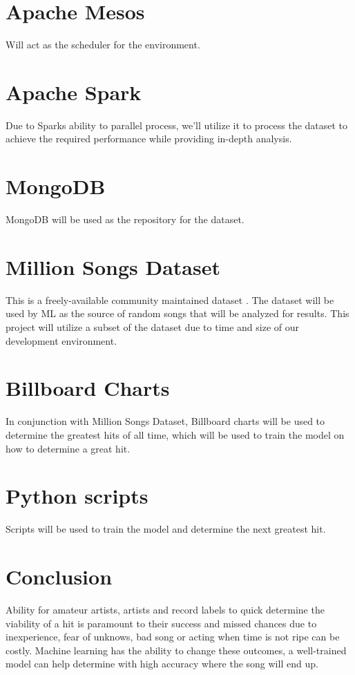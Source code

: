 \documentclass[9pt,twocolumn,twoside]{styles/osajnl}
\begin{document}
\section*{Apache Mesos}
Will act as the scheduler for the environment.

\section*{Apache Spark}
Due to Sparks ability to parallel process, we’ll utilize it to process
the dataset to achieve the required performance while providing
in-depth analysis.

\section*{MongoDB}
MongoDB will be used as the repository for the dataset.

\section{Million Songs Dataset}
This is a freely-available community maintained dataset  \cite{www-millionsong}. The dataset
will be used by ML as the source of random songs that will be analyzed
for results. This project will utilize a subset of the dataset due to
time and size of our development environment. 

\section*{Billboard Charts}
In conjunction with Million Songs Dataset, Billboard charts  \cite{www-billboard} will be
used to determine the greatest hits of all time, which will be used to
train the model on how to determine a great hit. 

\section*{Python scripts}
Scripts will be used to train the model and determine the next
greatest hit.


\section{Conclusion}

Ability for amateur artists, artists and record labels to quick
determine the viability of a hit is paramount to their success and
missed chances due to inexperience, fear of unknows, bad song or
acting when time is not ripe can be costly. Machine learning has the
ability to change these outcomes, a well-trained model can help
determine with high accuracy where the song will end up. 




 
\end{document}
